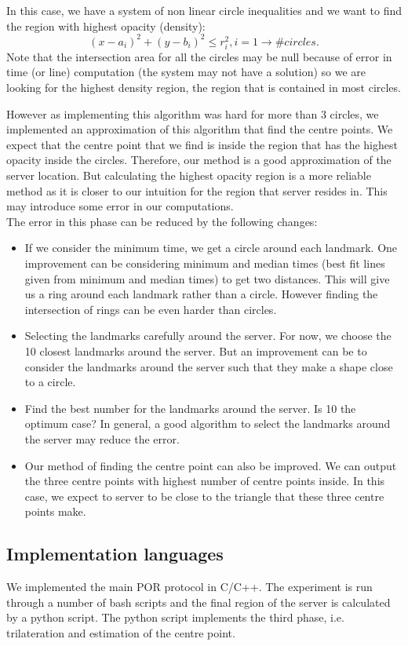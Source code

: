 \documentclass[12pt]{article}
\begin{document}
In this case, we have a system of non linear circle inequalities and we want to find
the region with highest opacity (density):
\[
(x-a_i)^2 + (y-b_i)^2 \le r_i^2, i=1 \rightarrow \#circles.
\]
Note that the intersection area for all the circles may be null because 
of error in time (or line) computation (the system may not have a solution) 
so we are looking for the highest
density region, the region that is contained in most circles.

However as implementing this algorithm was hard for more than 3 circles, we implemented an 
approximation of this algorithm that find the centre points. We expect that the centre point that 
we find is inside the region that has the highest opacity inside the circles. Therefore, our method 
is a good approximation of the server location. But calculating the highest opacity region 
is a more reliable method as it is closer to our intuition for the region that server resides in.
This may introduce some error in our computations. \\

 The error in this phase can be reduced by the following changes:
\begin{itemize}
\item If we consider the minimum time, we get a circle around each landmark. One improvement can be 
considering minimum and median times (best fit lines given from minimum and median times) 
to get two distances. This will give us a ring around each landmark rather than a circle. 
However finding the intersection of rings can be even harder than circles.

\item Selecting the landmarks carefully around the server. For now, we choose the 10 closest 
landmarks around the server. But an improvement can be to consider the landmarks around the server 
such that they make a shape close to a circle.

\item Find the best number for the landmarks around the server. Is 10 the optimum case? 
In general, a good algorithm to select the landmarks around the server may reduce the error.

\item Our method of finding the centre point can also be improved. We can output the three 
centre points with highest number of centre points inside. In this case, we expect to server 
to be close to the triangle that these three centre points make.
\end{itemize}

\subsection{Implementation languages}
We implemented the main POR protocol in C/C++. The experiment is run through a number of 
bash scripts and the final region of the server is calculated by a python script. The python 
script implements the third phase, i.e. trilateration and estimation of the centre point.



\end{document}
